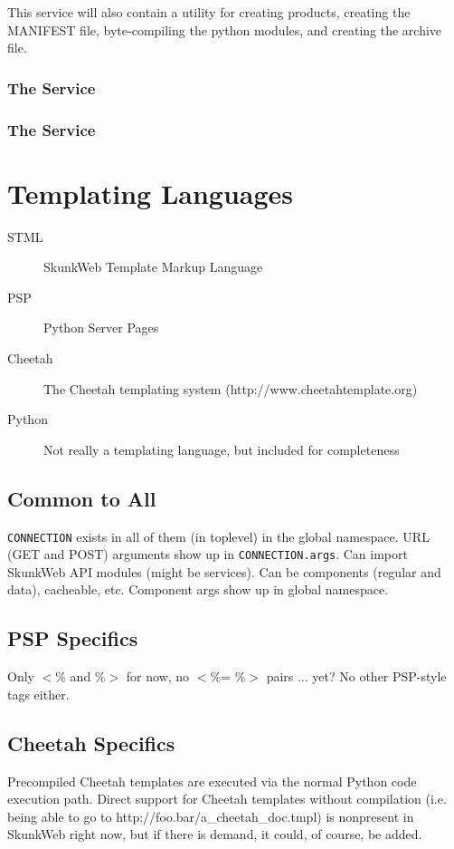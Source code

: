\documentclass{manual}
\begin{document}
This service will also contain a utility for creating products, creating
the MANIFEST file, byte-compiling the python modules, and creating the
archive file.
\subsection{The  Service}
\subsection{The  Service}
\chapter{Templating Languages}
\begin{description}
\item[STML] SkunkWeb Template Markup Language
\item[PSP] Python Server Pages
\item[Cheetah] The Cheetah templating system (http://www.cheetahtemplate.org)
\item[Python] Not really a templating language, but included for
completeness
\end{description}

\section{Common to All}
\texttt{CONNECTION} exists in all of them (in toplevel) in the global
namespace.  URL (GET and POST) arguments show up in
\texttt{CONNECTION.args}.  Can import SkunkWeb API modules (might be
services).  Can be components (regular and data), cacheable, etc.
Component args show up in global namespace.

\section{PSP Specifics}

Only $<$\% and \%$>$ for now, no $<$\%= \%$>$ pairs ... yet?  No other
PSP-style tags either.

\section{Cheetah Specifics}

Precompiled Cheetah templates are executed via the normal Python code
execution path.  Direct support for Cheetah templates without
compilation (i.e. being able to go to
http://foo.bar/a_cheetah_doc.tmpl) is nonpresent in SkunkWeb right
now, but if there is demand, it could, of course, be added.
\end{document}
